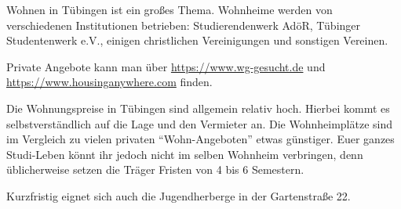 Wohnen in Tübingen ist ein großes Thema.  Wohnheime werden von verschiedenen Institutionen betrieben: Studierendenwerk AdöR, Tübinger Studentenwerk e.V., einigen christlichen Vereinigungen und sonstigen Vereinen. 

Private Angebote kann man über \url{https://www.wg-gesucht.de} und \url{https://www.housinganywhere.com} finden.	%

Die Wohnungspreise in Tübingen sind allgemein relativ hoch. Hierbei kommt es selbstverständlich auf die Lage und den Vermieter an. Die Wohnheimplätze sind im Vergleich zu vielen privaten "`Wohn-Angeboten"' etwas günstiger.  Euer ganzes Studi-Leben könnt ihr jedoch nicht im selben Wohnheim verbringen, denn üblicherweise setzen die Träger Fristen von 4 bis 6 Semestern.



Kurzfristig eignet sich auch die Jugendherberge in der Gartenstraße 22. %
